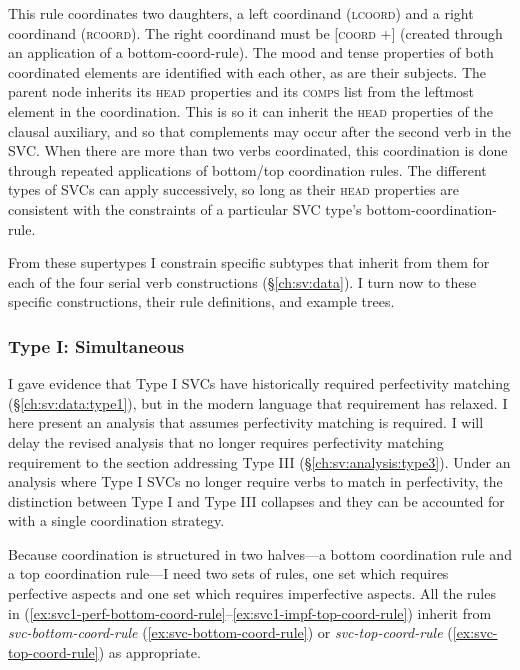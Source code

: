 This rule coordinates two daughters, a left coordinand (\textsc{lcoord}) and a right coordinand (\textsc{rcoord}). The right coordinand must be [\textsc{coord} +] (created through an application of a bottom-coord-rule). The mood and tense properties of both coordinated elements are identified with each other, as are their subjects. The parent node inherits its \textsc{head} properties and its \textsc{comps} list from the leftmost element in the coordination. This is so it can inherit the \textsc{head} properties of the clausal auxiliary, and so that complements may occur after the second verb in the SVC. When there are more than two verbs coordinated, this coordination is done through repeated applications of bottom/top coordination rules. The different types of SVCs can apply successively, so long as their \textsc{head} properties are consistent with the constraints of a particular SVC type's bottom-coordination-rule.

From these supertypes I constrain specific subtypes that inherit from them for each of the four serial verb constructions (\S\ref{ch:sv:data}). I turn now to these specific constructions, their rule definitions, and example trees.

\subsubsection{Type I: Simultaneous} \label{ch:sv:analysis:type1}

I gave evidence that Type I SVCs have historically required perfectivity matching (\S\ref{ch:sv:data:type1}), but in the modern language that requirement has relaxed. I here present an analysis that assumes perfectivity matching is required. I will delay the revised analysis that no longer requires perfectivity matching requirement to the section addressing Type III (\S\ref{ch:sv:analysis:type3}). Under an analysis where Type I SVCs no longer require verbs to match in perfectivity, the distinction between Type I and Type III collapses and they can be accounted for with a single coordination strategy.

Because coordination is structured in two halves---a bottom coordination rule and a top coordination rule---I need two sets of rules, one set which requires perfective aspects and one set which requires imperfective aspects. All the rules in (\ref{ex:svc1-perf-bottom-coord-rule}--\ref{ex:svc1-impf-top-coord-rule}) inherit from {\textit{svc-bottom-coord-rule}} (\ref{ex:svc-bottom-coord-rule}) or {\textit{svc-top-coord-rule}} (\ref{ex:svc-top-coord-rule}) as appropriate.

